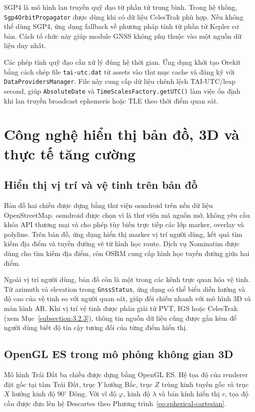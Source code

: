 \documentclass[../DoAn.tex]{subfiles}
\begin{document}
SGP4 là mô hình lan truyền quỹ đạo từ phần tử trung bình. Trong hệ thống, \texttt{Sgp4OrbitPropagator} được dùng khi có dữ liệu CelesTrak phù hợp. Nếu không thể dùng SGP4, ứng dụng fallback về phương pháp tính từ phần tử Kepler cơ bản. Cách tổ chức này giúp module GNSS không phụ thuộc vào một nguồn dữ liệu duy nhất.

Các phép tính quỹ đạo cần xử lý đúng hệ thời gian. Ứng dụng khởi tạo Orekit bằng cách chép file \texttt{tai-utc.dat} từ assets vào thư mục cache và đăng ký với \texttt{DataProvidersManager}. File này cung cấp dữ liệu chênh lệch TAI-UTC/leap second, giúp \texttt{AbsoluteDate} và \texttt{TimeScalesFactory.getUTC()} làm việc ổn định khi lan truyền broadcast ephemeris hoặc TLE theo thời điểm quan sát.

\section{Công nghệ hiển thị bản đồ, 3D và thực tế tăng cường}
\label{section:3.3}
\subsection{Hiển thị vị trí và vệ tinh trên bản đồ}
\label{subsection:3.3.1}
Bản đồ hai chiều được dựng bằng thư viện osmdroid trên nền dữ liệu OpenStreetMap. osmdroid được chọn vì là thư viện mã nguồn mở, không yêu cầu khóa API thương mại và cho phép tùy biến trực tiếp các lớp marker, overlay và polyline. Trên bản đồ, ứng dụng hiển thị marker vị trí người dùng, kết quả tìm kiếm địa điểm và tuyến đường vẽ từ hình học route. Dịch vụ Nominatim được dùng cho tìm kiếm địa điểm, còn OSRM cung cấp hình học tuyến đường giữa hai điểm.

Ngoài vị trí người dùng, bản đồ còn là một trong các kênh trực quan hóa vệ tinh. Từ azimuth và elevation trong \texttt{GnssStatus}, ứng dụng có thể biểu diễn hướng và độ cao của vệ tinh so với người quan sát, giúp đối chiếu nhanh với mô hình 3D và màn hình AR. Khi vị trí vệ tinh được phân giải từ PVT, IGS hoặc CelesTrak (xem Mục~\ref{subsection:3.2.3}), thông tin nguồn dữ liệu cũng được gắn kèm để người dùng biết độ tin cậy tương đối của từng điểm hiển thị.

\subsection{OpenGL ES trong mô phỏng không gian 3D}
\label{subsection:3.3.2}
Mô hình Trái Đất ba chiều được dựng bằng OpenGL ES. Hệ tọa độ của renderer đặt gốc tại tâm Trái Đất, trục $Y$ hướng Bắc, trục $Z$ trùng kinh tuyến gốc và trục $X$ hướng kinh độ $90^\circ$ Đông. Với vĩ độ $\varphi$, kinh độ $\lambda$ và bán kính hiển thị $r$, tọa độ cầu được đưa lên hệ Descartes theo Phương trình~\ref{eq:spherical-cartesian}.
\end{document}
